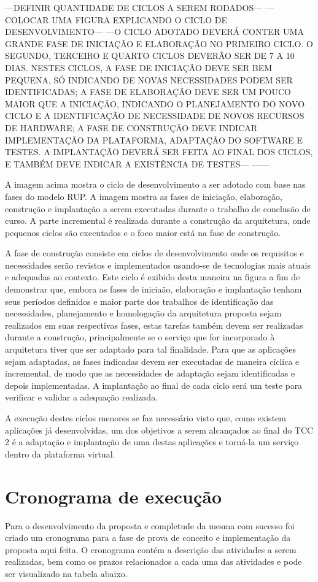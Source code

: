 ---DEFINIR QUANTIDADE DE CICLOS A SEREM RODADOS---
---COLOCAR UMA FIGURA EXPLICANDO O CICLO DE DESENVOLVIMENTO---
---O CICLO ADOTADO DEVERÁ CONTER UMA GRANDE FASE DE INICIAÇÃO E ELABORAÇÃO NO PRIMEIRO CICLO. O SEGUNDO, TERCEIRO E QUARTO CICLOS DEVERÃO SER DE 7 A 10 DIAS. NESTES CICLOS, A FASE DE INICIAÇÃO DEVE SER BEM PEQUENA, SÓ INDICANDO DE NOVAS NECESSIDADES PODEM SER IDENTIFICADAS; A FASE DE ELABORAÇÃO DEVE SER UM POUCO MAIOR QUE A INICIAÇÃO, INDICANDO O PLANEJAMENTO DO NOVO CICLO E A IDENTIFICAÇÃO DE NECESSIDADE DE NOVOS RECURSOS DE HARDWARE; A FASE DE CONSTRUÇÃO DEVE INDICAR IMPLEMENTAÇÃO DA PLATAFORMA, ADAPTAÇÃO DO SOFTWARE E TESTES. A IMPLANTAÇÃO DEVERÁ SER FEITA AO FINAL  DOS CICLOS, E TAMBÉM DEVE INDICAR A EXISTÊNCIA DE TESTES---
------


A imagem acima mostra o ciclo de desenvolvimento a ser adotado com base nas fases do modelo RUP. A imagem mostra as fases de iniciação, elaboração, construção e implantação a serem executadas durante o trabalho de conclusão de curso. A parte incremental é realizada durante a construção da arquitetura, onde pequenos ciclos são executados e o foco maior está na fase de construção.

A fase de construção consiste em ciclos de desenvolvimento onde os requisitos e necessidades serão revistos e implementados usando-se de tecnologias mais atuais e adequadas ao contexto. Este ciclo é exibido desta maneira na figura a fim de demonstrar que, embora as fases de iniciaão, elaboração e implantação tenham seus períodos definidos e maior parte dos trabalhos de identificação das necessidades, planejamento e homologação da arquitetura proposta sejam realizados em suas respectivas fases, estas tarefas também devem ser realizadas durante a construção, principalmente se o serviço que for incorporado à arquitetura tiver que ser adaptado para tal finalidade. Para que as aplicações sejam adaptadas, as fases indicadas devem ser executadas de maneira cíclica e incremental, de modo que as necessidades de adaptação sejam identificadas e depois implementadas. A implantação ao final de cada ciclo será um teste para verificar e validar a adequação realizada.

A execução destes ciclos menores se faz necessário visto que, como existem aplicações já desenvolvidas, um dos objetivos a serem alcançados ao final do TCC 2 é a adaptação e implantação de uma destas aplicações e torná-la um serviço dentro da plataforma virtual.

\section{Cronograma de execução}
Para o desenvolvimento da proposta e completude da mesma com sucesso foi criado um cronograma para a fase de prova de conceito e implementação da proposta aqui feita. O cronograma contém a descrição das atividades a serem realizadas, bem como os prazos relacionados a cada uma das atividades e pode ser visualizado na tabela abaixo.

